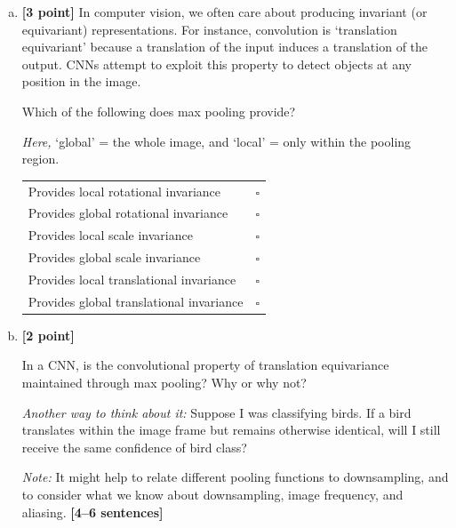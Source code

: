 \begin{enumerate}[(a)]
\pagebreak
    \item \textbf{[3 point]}
    In computer vision, we often care about producing invariant (or equivariant) representations. For instance, convolution is `translation equivariant' because a translation of the input induces a translation of the output. CNNs attempt to exploit this property to detect objects at any position in the image.

    \begin{tcolorbox}[colback=orange!5!white,colframe=orange!75!black]
    Which of the following does max pooling provide?
    \end{tcolorbox}

    \emph{Here,} `global' = the whole image, and `local' = only within the pooling region.

    \begin{tcolorbox}[colback=white!5!white,colframe=green!75!black]
    \begin{tabular}[h]{lr}
    \toprule
    Provides local rotational invariance & $\square$ \\
    Provides global rotational invariance & $\square$ \\
    Provides local scale invariance & $\square$ \\
    Provides global scale invariance & $\square$ \\
    Provides local translational invariance & $\square$ \\
    Provides global translational invariance & $\square$ \\
    \bottomrule
    \end{tabular}
    \end{tcolorbox}

    \item \textbf{[2 point]}
    \begin{tcolorbox}[colback=orange!5!white,colframe=orange!75!black]
    In a CNN, is the convolutional property of translation equivariance maintained through max pooling? Why or why not?
    
    \vspace{1em}
    \emph{Another way to think about it:} Suppose I was classifying birds. If a bird translates within the image frame but remains otherwise identical, will I still receive the same confidence of bird class?

    \vspace{1em}
    \emph{Note:} It might help to relate different pooling functions to downsampling, and to consider what we know about downsampling, image frequency, and aliasing.
    \textbf{[4--6 sentences]}
    \end{tcolorbox}


\end{enumerate}
